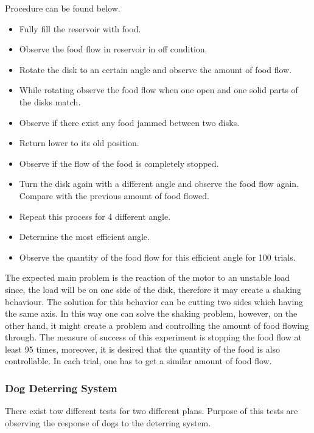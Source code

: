 Procedure can be found below.
\begin{itemize}
    \item Fully fill the reservoir with food.
    \item Observe the food flow in reservoir in off condition.
    \item Rotate the disk to an certain angle and observe the amount of food flow.
    \item While rotating observe the food flow when one open and one solid parts of the disks match.
    \item Observe if there exist any food jammed between two disks.
    \item Return lower to its old position.
    \item Observe if the flow of the food is completely stopped. 
    \item Turn the disk again with a different angle and observe the food flow again. Compare with the previous amount of food flowed.
    \item Repeat this process for 4 different angle. 
    \item Determine the most efficient angle.
    \item Observe the quantity of the food flow for this efficient angle for 100 trials. 
\end{itemize}

The expected main problem is the reaction of the motor to an unstable load since, the load will be on one side of the disk, therefore it may create a shaking behaviour. The solution for this behavior can be cutting two sides which having the same axis. In this way one can solve the shaking problem, however, on the other hand, it might create a problem and controlling the amount of food flowing through.
The measure of success of this experiment is stopping the food flow at least 95 times, moreover, it is desired that the quantity of the food is also controllable. In each trial, one has to get a similar amount of food flow.

\subsubsection{Dog Deterring System}
There exist tow different tests for two different plans. Purpose of this tests are observing the response of dogs to the deterring system.
